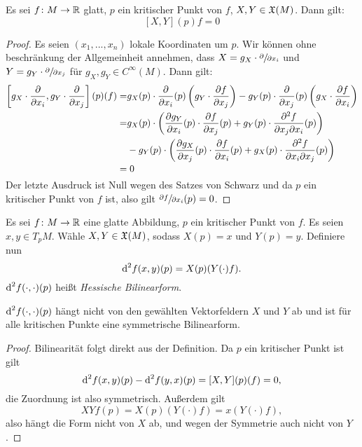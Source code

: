 \begin{prop}
    \label{prop: lie-klammer ist null}
    Es sei $f \colon M \to { \mathbb R }$ glatt, $p$ ein kritischer Punkt von $f$, 
    $X, Y \in { \mathfrak{X} } (M)$. Dann gilt:
    \[ [X, Y] (p) f = 0 \]
\end{prop}

\begin{proof}
    Es seien $(x_1, ..., x_n)$ lokale Koordinaten um $p$. Wir können ohne beschränkung
    der Allgemeinheit annehmen, dass $X = g_X \cdot \pderive{x_i}$ und 
    $Y = g_Y \cdot \pderive{x_j}$ für $g_X, g_Y \in C^{\infty} (M)$. Dann gilt:
    \begin{align*}
        \left[g_X \cdot \pderive{x_i}, g_Y \cdot \pderive{x_j}\right] (p) (f) = & 
            g_X (p) \cdot \pderive{x_i} (p) \left(g_Y \cdot \pderive[f]{x_j} \right) -
            g_Y (p) \cdot \pderive{x_j} (p) \left(g_X \cdot \pderive[f]{x_i} \right) \\
        = & g_X (p) \cdot \left( \pderive[g_Y]{x_i}(p) \cdot \pderive[f]{x_j}(p) + 
                g_Y(p) \cdot \pdderive[f]{x_j}{x_i}(p) \right) \\ 
        & - g_Y (p) \cdot \left( \pderive[g_X]{x_j}(p) \cdot \pderive[f]{x_i}(p) + 
            g_X (p) \cdot \pdderive[f]{x_i}{x_j}(p) \right) \\
        = & \; 0
    \end{align*}
    Der letzte Ausdruck ist Null wegen des Satzes von Schwarz und da $p$ ein kritischer
    Punkt von $f$ ist, also gilt $\pderive[f]{x_i}(p) = 0$.
\end{proof}

\begin{definition}
    Es sei $f \colon M \to { \mathbb R }$ eine glatte Abbildung, $p$ ein kritischer Punkt von $f$.
    Es seien $x, y \in T_pM$. Wähle $X, Y \in { \mathfrak{X} } (M)$, sodass $X(p) = x$ und 
    $Y(p) = y$. Definiere nun
    \[ { \operatorname{d} }^2 f (x, y) (p) = X(p)(Y(\cdot)f). \]
    ${ \operatorname{d} }^2 f (\cdot, \cdot) (p)$ heißt \textit{Hessische Bilinearform}. 
\end{definition}

\begin{prop}
    \label{prop: hessische ist sym bilinearform}
    ${ \operatorname{d} }^2 f (\cdot, \cdot) (p)$ hängt nicht von den gewählten Vektorfeldern $X$ und $Y$ ab 
    und ist für alle kritischen Punkte eine symmetrische Bilinearform.
\end{prop}

\begin{proof}
    Bilinearität folgt direkt aus der Definition.
    Da $p$ ein kritischer Punkt ist gilt 
    \[ { \operatorname{d} }^2 f (x, y) (p) - { \operatorname{d} }^2 f (y, x) (p) = [X, Y] (p) (f) = 0, \]
    die Zuordnung ist also symmetrisch. Außerdem gilt
    \[ XY f (p) = X(p) (Y(\cdot) f) = x(Y(\cdot) f), \]
    also hängt die Form nicht von $X$ ab, und wegen der Symmetrie auch nicht von $Y$.
\end{proof}


